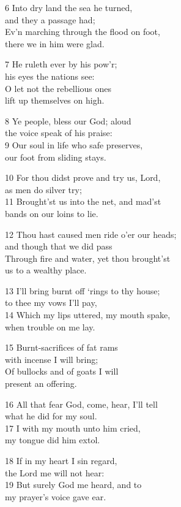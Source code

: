 6 Into dry land the sea he turned,\\
and they a passage had;\\
Ev’n marching through the flood on foot,\\
there we in him were glad.

7 He ruleth ever by his pow’r;\\
his eyes the nations see:\\
O let not the rebellious ones\\
lift up themselves on high.

8 Ye people, bless our God; aloud\\
the voice speak of his praise:\\
9 Our soul in life who safe preserves,\\
our foot from sliding stays.

10 For thou didst prove and try us, Lord,\\
as men do silver try;\\
11 Brought’st us into the net, and mad’st\\
bands on our loins to lie.

12 Thou hast caused men ride o’er our heads;\\
and though that we did pass\\
Through fire and water, yet thou brought’st\\
us to a wealthy place.

13 I’ll bring burnt off ‘rings to thy house;\\
to thee my vows I’ll pay,\\
14 Which my lips uttered, my mouth spake,\\
when trouble on me lay.

15 Burnt-sacrifices of fat rams\\
with incense I will bring;\\
Of bullocks and of goats I will\\
present an offering.

16 All that fear God, come, hear, I’ll tell\\
what he did for my soul.\\
17 I with my mouth unto him cried,\\
my tongue did him extol.

18 If in my heart I sin regard,\\
the Lord me will not hear:\\
19 But surely God me heard, and to\\
my prayer’s voice gave ear.

